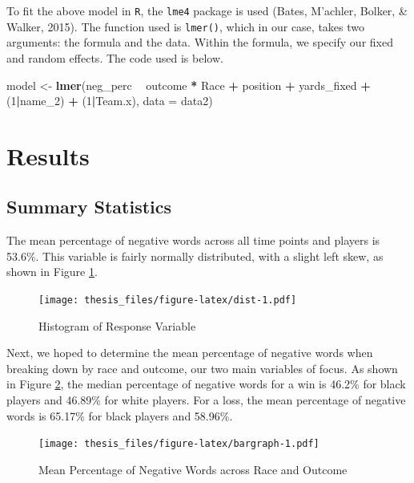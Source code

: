 \documentclass[12pt,twoside]{reedthesis}
\newenvironment{Shaded}{\begin{snugshade}}{\end{snugshade}}
\newcommand{\KeywordTok}[1]{\textcolor[rgb]{0.13,0.29,0.53}{\textbf{#1}}}
\newcommand{\DataTypeTok}[1]{\textcolor[rgb]{0.13,0.29,0.53}{#1}}
\newcommand{\DecValTok}[1]{\textcolor[rgb]{0.00,0.00,0.81}{#1}}
\newcommand{\StringTok}[1]{\textcolor[rgb]{0.31,0.60,0.02}{#1}}
\newcommand{\OperatorTok}[1]{\textcolor[rgb]{0.81,0.36,0.00}{\textbf{#1}}}
\newcommand{\NormalTok}[1]{#1}
\begin{document}
To fit the above model in \texttt{R}, the \texttt{lme4} package is used
(Bates, M'achler, Bolker, \& Walker, 2015). The function used is
\texttt{lmer()}, which in our case, takes two arguments: the formula and
the data. Within the formula, we specify our fixed and random effects.
The code used is below.

\small
\begin{Shaded}
\begin{Highlighting}[]
\NormalTok{model <-}\StringTok{ }\KeywordTok{lmer}\NormalTok{(neg_perc }\OperatorTok{~}\StringTok{ }\NormalTok{outcome }\OperatorTok{*}\StringTok{ }\NormalTok{Race }\OperatorTok{+}\StringTok{ }\NormalTok{position }\OperatorTok{+}\StringTok{ }\NormalTok{yards_fixed}
              \OperatorTok{+}\StringTok{ }\NormalTok{(}\DecValTok{1}\OperatorTok{|}\NormalTok{name_}\DecValTok{2}\NormalTok{) }\OperatorTok{+}\StringTok{ }\NormalTok{(}\DecValTok{1}\OperatorTok{|}\NormalTok{Team.x),}
              \DataTypeTok{data =}\NormalTok{ data2)}
\end{Highlighting}
\end{Shaded}
\normalsize

\section{Results}\label{results-1}

\subsection{Summary Statistics}\label{summary-statistics}

The mean percentage of negative words across all time points and players
is 53.6\%. This variable is fairly normally distributed, with a slight
left skew, as shown in Figure \ref{fig:dist}.
\begin{figure}
\centering
\texttt{[image: thesis\_files/figure-latex/dist-1.pdf]}
\caption{\label{fig:dist}Histogram of Response Variable}
\end{figure}
Next, we hoped to determine the mean percentage of negative words when
breaking down by race and outcome, our two main variables of focus. As
shown in Figure \ref{fig:bargraph}, the median percentage of negative
words for a win is 46.2\% for black players and 46.89\% for white
players. For a loss, the mean percentage of negative words is 65.17\%
for black players and 58.96\%.
\begin{figure}
\centering
\texttt{[image: thesis\_files/figure-latex/bargraph-1.pdf]}
\caption{\label{fig:bargraph}Mean Percentage of Negative Words across Race
and Outcome}
\end{figure}
\end{document}
